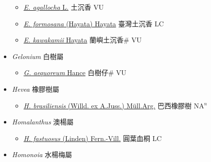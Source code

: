 \begin{itemize}
  \begin{itemize}
        \item[] \href{http://www.theplantlist.org/tpl1.1/search?q=Excoecaria+agallocha}{\textit{E. agallocha} L.}   土沉香 VU
        \item[] \href{http://www.theplantlist.org/tpl1.1/search?q=Excoecaria+formosana}{\textit{E. formosana} (Hayata) Hayata}   臺灣土沉香 LC
        \item[] \href{http://www.theplantlist.org/tpl1.1/search?q=Excoecaria+kawakamii}{\textit{E. kawakamii} Hayata}   蘭嶼土沉香\# VU
  \end{itemize}
 \item[] \textit{Gelonium} 白樹屬
                    
  \begin{itemize}
        \item[] \href{http://www.theplantlist.org/tpl1.1/search?q=Gelonium+aequoreum}{\textit{G. aequoreum} Hance}   白樹仔\# VU
  \end{itemize}
 \item[] \textit{Hevea} 橡膠樹屬
                    
  \begin{itemize}
        \item[] \href{http://www.theplantlist.org/tpl1.1/search?q=Hevea+brasiliensis}{\textit{H. brasiliensis} (Willd. ex A.Juss.) Müll.Arg.}   巴西橡膠樹 NA$^n$
  \end{itemize}
 \item[] \textit{Homalanthus} 澳楊屬
                    
  \begin{itemize}
        \item[] \href{http://www.theplantlist.org/tpl1.1/search?q=Homalanthus+fastuosus}{\textit{H. fastuosus} (Linden) Fern.-Vill.}     圓葉血桐 LC
  \end{itemize}
 \item[] \textit{Homonoia} 水楊梅屬
                    

\end{itemize}
